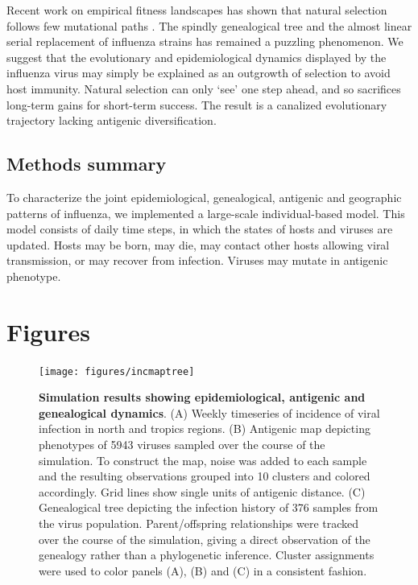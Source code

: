 Recent work on empirical fitness landscapes has shown that natural selection follows few mutational paths \cite{Weinreich06}.  The spindly genealogical tree and the almost linear serial replacement of influenza strains has remained a puzzling phenomenon.  We suggest that the evolutionary and epidemiological dynamics displayed by the influenza virus may simply be explained as an outgrowth of selection to avoid host immunity.  Natural selection can only `see' one step ahead, and so sacrifices long-term gains for short-term success.  The result is a canalized evolutionary trajectory lacking antigenic diversification.

\subsection*{Methods summary}

To characterize the joint epidemiological, genealogical, antigenic and geographic patterns of influenza, we implemented a large-scale individual-based model.  This model consists of daily time steps, in which the states of hosts and viruses are updated.  Hosts may be born, may die, may contact other hosts allowing viral transmission, or may recover from infection.  Viruses may mutate in antigenic phenotype.




\pagebreak

\section*{Figures}

\begin{figure}[H]
	\centering
	\texttt{[image: figures/incmaptree]}
	\caption{\textbf{Simulation results showing epidemiological, antigenic and genealogical dynamics}. (A) Weekly timeseries of incidence of viral infection in north and tropics regions. (B) Antigenic map depicting phenotypes of 5943 viruses sampled over the course of the simulation.  To construct the map, noise was added to each sample and the resulting observations grouped into 10 clusters and colored accordingly.  Grid lines show single units of antigenic distance. (C) Genealogical tree depicting the infection history of 376 samples from the virus population.  Parent/offspring relationships were tracked over the course of the simulation, giving a direct observation of the genealogy rather than a phylogenetic inference. Cluster assignments were used to color panels (A), (B) and (C) in a consistent fashion.}
	\label{incmaptree}
\end{figure}

